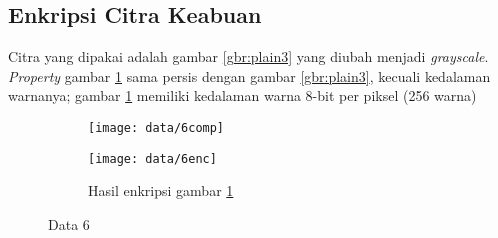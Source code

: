 \subsection{Enkripsi Citra Keabuan}
Citra yang dipakai adalah gambar \ref{gbr:plain3} yang diubah menjadi \textit{grayscale}.
 \textit{Property} gambar \ref{gbr:plain6} sama persis dengan gambar \ref{gbr:plain3}, kecuali
 kedalaman warnanya; gambar \ref{gbr:plain6} memiliki kedalaman warna 8-bit per piksel (256 warna)
\begin{figure}\centering
	\begin{subfigure}{\textwidth}
		\texttt{[image: data/6comp]}
		\caption{}
		\label{gbr:plain6}
	\end{subfigure}
	\begin{subfigure}{\textwidth}
		\texttt{[image: data/6enc]}
		\caption{Hasil enkripsi gambar \ref{gbr:plain6}}
		\label{gbr:enc6}
	\end{subfigure}
	\caption{Data 6}
	\label{gbr:data6}
\end{figure}



\newpage